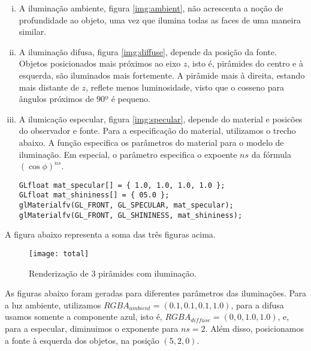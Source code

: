 \documentclass[12pt, a4paper]{article}
\begin{document}
\begin {enumerate}[i.]
  \item A iluminação ambiente, figura \ref{img:ambient}, não acrescenta a noção
  de profundidade ao objeto, uma vez que ilumina todas as faces de uma maneira
  similar.

  \item  A iluminação difusa, figura \ref{img:diffuse}, depende da posição da
  fonte. Objetos posicionados mais próximos ao eixo \(z\), isto é, pirâmides do centro e à esquerda, são
  iluminados mais fortemente. A pirâmide mais à direita, estando mais distante
  de \(z\), reflete menos luminosidade, visto que o cosseno para ângulos
  próximos de 90º é pequeno.

  \item A ilumicação especular, figura \ref{img:specular}, depende do material e
  posicões do observador e fonte. Para a especificação do material, utilizamos o
  trecho abaixo. A função  especifica os parâmetros do
  material para o modelo de iluminação. Em especial, o parâmetro
   especifica o expoente \(ns\) da fórmula \((\cos
  \phi)^{ns}\).
  
\begin{lstlisting}[keywordstyle=\ttfamily, style=nonumbers] 
GLfloat mat_specular[] = { 1.0, 1.0, 1.0, 1.0 };
GLfloat mat_shininess[] = { 05.0 };
glMaterialfv(GL_FRONT, GL_SPECULAR, mat_specular);
glMaterialfv(GL_FRONT, GL_SHININESS, mat_shininess);
\end{lstlisting}

\end{enumerate}


A figura abaixo representa a soma das três figuras acima.

\FloatBarrier

\begin{figure}[h!]
\centering
\texttt{[image: total]}
\caption{Renderização de 3 pirâmides com iluminação.}
\label{img:total}
\end{figure}

\FloatBarrier

As figuras abaixo foram geradas para diferentes parâmetros das iluminações. Para
a luz ambiente, utilizamos \(RGBA_{ambient} = (0.1, 0.1, 0.1, 1.0)\), para a
difusa usamos somente a componente azul, isto é, \(RGBA_{diffuse} = (0, 0,
1.0, 1.0)\), e, para a especular, diminuimos o exponente para \(ns = 2\). Além
disso, posicionamos a fonte à esquerda dos objetos, na posição \((5, 2, 0)\).
\end{document}
